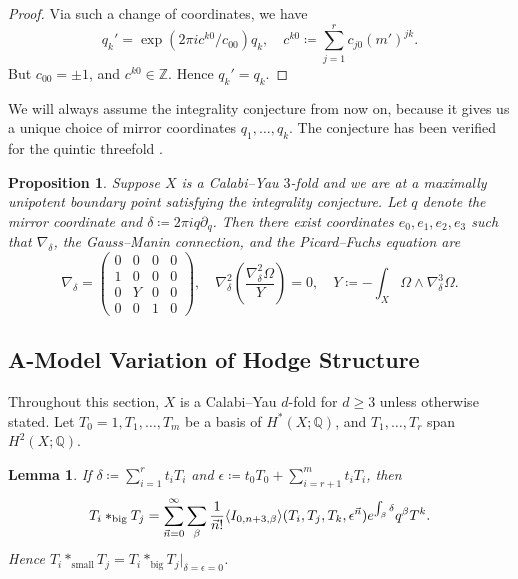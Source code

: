 \documentclass{report}
\theoremstyle{plain}
\newtheorem{lemma}[theorem]{Lemma}
\newtheorem{proposition}[theorem]{Proposition}
\theoremstyle{definition}
\theoremstyle{remark}
\newcommand{\di}{\partial}
\newcommand{\bQ}{\mathbb{Q}}
\newcommand{\bZ}{\mathbb{Z}}
\DeclarePairedDelimiter{\inner}{\langle}{\rangle}
\begin{document}
\begin{proof}
  Via such a change of coordinates, we have
  \[ q_k' = \exp(2\pi i c^{k0}/c_{00}) q_k, \quad c^{k0} \coloneqq \sum_{j=1}^r c_{j0} (m')^{jk}. \]
  But $c_{00} = \pm 1$, and $c^{k0} \in \bZ$. Hence $q_k' = q_k$.
\end{proof}

We will always assume the integrality conjecture from now on, because
it gives us a unique choice of mirror coordinates $q_1, \ldots, q_k$.
The conjecture has been verified for the quintic threefold
\cite{Morrison1993}.

\begin{proposition} \cite[Proposition 5.6.1]{Cox1999} \label{thm:picard-fuchs-equation-in-monodromy-coordinates}
  Suppose $X$ is a Calabi--Yau $3$-fold and we are at a maximally
  unipotent boundary point satisfying the integrality conjecture. Let
  $q$ denote the mirror coordinate and $\delta \coloneqq 2\pi i q
  \di_q$. Then there exist coordinates $e_0, e_1, e_2, e_3$ such that
  $\nabla_\delta$, the Gauss--Manin connection, and the Picard--Fuchs
  equation are
  \[ \nabla_\delta = \begin{pmatrix} 0 & 0 & 0 & 0 \\ 1 & 0 & 0 & 0 \\ 0 & Y & 0 & 0 \\ 0 & 0 & 1 & 0 \end{pmatrix}, \quad \nabla_\delta^2 \left(\frac{\nabla_\delta^2 \Omega}{Y}\right) = 0, \quad Y \coloneqq -\int_X \Omega \wedge \nabla_\delta^3\Omega. \]
\end{proposition}

\subsection{A-Model Variation of Hodge Structure}

Throughout this section, $X$ is a Calabi--Yau $d$-fold for $d \ge 3$
unless otherwise stated. Let $T_0 = 1, T_1, \ldots, T_m$ be a basis of
$H^*(X; \bQ)$, and $T_1, \ldots, T_r$ span $H^2(X; \bQ)$.

\begin{lemma}
  If $\delta \coloneqq \sum_{i=1}^r t_i T_i$ and $\epsilon \coloneqq
  t_0T_0 + \sum_{i=r+1}^m t_i T_i$, then
  \[ T_i *_{\text{big}} T_j = \sum_{\vec n = 0}^\infty \sum_\beta \frac{1}{\vec n!} \inner{I_{0,n+3,\beta}}(T_i, T_j, T_k, \epsilon^{\vec n}) e^{\int_\beta \delta} q^\beta T^k. \]
  Hence $T_i *_{\text{small}} T_j = T_i *_{\text{big}} T_j|_{\delta =
    \epsilon = 0}$.
\end{lemma}
\end{document}
